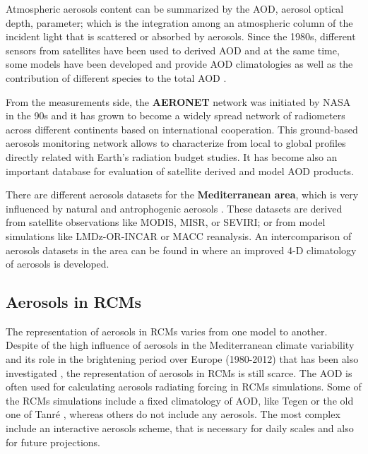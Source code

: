 Atmospheric aerosols content can be summarized by the AOD, aerosol optical depth, parameter; which is the integration among an atmospheric column of the incident light that is scattered or absorbed by aerosols. Since the 1980s, different sensors from satellites have been used to derived AOD and at the same time, some models have been developed and provide AOD climatologies as well as the contribution of different species to the total AOD \cite*{Nabat2013}.

From the measurements side, the \textbf{AERONET} network \cite*{Holben1998} was initiated by NASA in the 90s and it has grown to become a widely spread network of radiometers across different continents based on international cooperation. This ground-based aerosols monitoring network allows to characterize from local to global profiles directly related with Earth's radiation budget studies. It has become also an important database for evaluation of satellite derived and model AOD products.

There are different aerosols datasets for the \textbf{Mediterranean area}, which is very influenced by natural and antrophogenic aerosols \cite*{Lelieveld}. These datasets are derived from satellite observations like MODIS, MISR, or SEVIRI; or from model simulations like LMDz-OR-INCAR or MACC reanalysis. An intercomparison of aerosols datasets in the area can be found in \cite*{Nabat2013} where an improved 4-D climatology of aerosols is developed.

\subsection{Aerosols in RCMs}

The representation of aerosols in RCMs varies from one model to another. Despite of the high influence of aerosols in the Mediterranean climate variability \cite*{Nabat2014} and its role in the brightening period over Europe (1980-2012) that has been also investigated \cite*{Nabat2014, Nabat2015, Wild2009}, the representation of aerosols in RCMs is still scarce. The AOD is often used for calculating aerosols radiating forcing in RCMs simulations. Some of the RCMs simulations include a fixed climatology of AOD, like Tegen or the old one of Tanré \cite*{Tegen1997, Tanre1984}, whereas others do not  include any aerosols. The most complex include an interactive aerosols scheme, that is necessary for daily scales and also for future projections.\cite*{Nabat2013}


